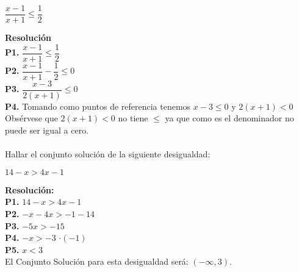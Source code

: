 \documentclass[12pt,a4paper]{book}
\begin{document}
{{\begin{center}
$ \dfrac{x-1}{x+1} \leq \dfrac{1}{2} $
\end{center}
\textbf{Resolución}\\${ }$\\
\textbf{P1.} $ \dfrac{x-1}{x+1} \leq \dfrac{1}{2} $ \\${ }$\\
\textbf{P2.} $ \dfrac{x-1}{x+1} - \dfrac{1}{2} \leq 0 $ \\${ }$\\
\textbf{P3.} $ \dfrac{x-3}{2(x+1)} \leq 0 $ \\${ }$\\
\textbf{P4.} Tomando como puntos de referencia tenemos $x - 3 \leq 0$ y $2(x+1) < 0$\\${ }$\\
Obsérvese que $2(x+1) < 0$ no tiene $\leq$ ya que como es el denominador no puede ser igual a cero.\\${ }$\\
\noindent{El Conjunto Solución es: $(-1,3]$.}\\${ }$\\
 
Hallar el conjunto solución de la siguiente desigualdad:
\begin{center}
$14-x>4x-1$
\end{center}
\textbf{Resolución:}\\${ }$\\
\textbf{P1. } $14-x>4x-1$\\
\textbf{P2. } $-x-4x>-1-14$\\
\textbf{P3. } $-5x > -15 $\\
\textbf{P4. } $-x > -3 $  $ \cdot(-1)$\\
\textbf{P5. } $x <3 $\\${ }$\\
El Conjunto Solución para esta desigualdad será: $(-\infty,3).$
\\${ }$\\

}}
\end{document}
